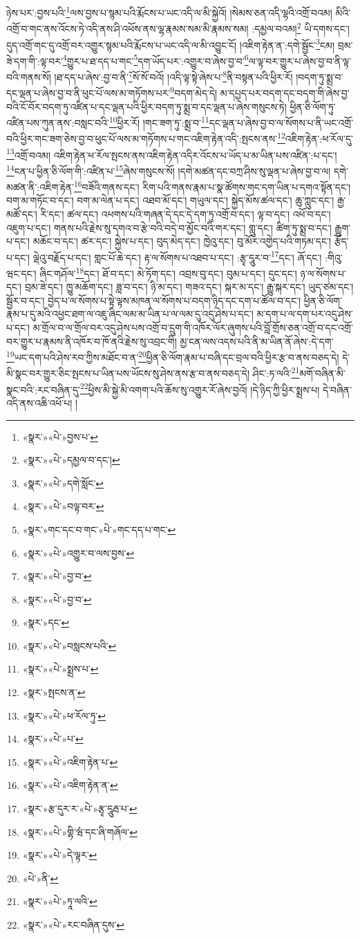 ཉེས་པར་:བྱས་པའི་\footnote{«སྣར་»«པེ་»བྱས་པ་}ལས་བྱས་པ་སྙམ་པའི་རྨོངས་པ་ཡང་འདི་ལ་མི་སྐྱེའོ། །སེམས་ཅན་འདི་ལྷའི་འགྲོ་བའམ། མིའི་འགྲོ་བ་གང་ནས་འོངས་ཏེ་འདི་ནས་ཤི་འཕོས་ནས་ལྷ་རྣམས་སམ་མི་རྣམས་སམ། :དམྱལ་བའམ།\footnote{«སྣར་»«པེ་»དམྱལ་བ་དང་།} ཡི་དགས་དང་། དུད་འགྲོ་གང་དུ་འགྲོ་བར་འགྱུར་སྙམ་པའི་རྨོངས་པ་ཡང་འདི་ལ་མི་འབྱུང་ངོ། །འཇིག་རྟེན་ན་:དགེ་སྦྱོང་\footnote{«སྣར་»«པེ་»དགེ་སློང་}ངམ། བྲམ་ཟེ་དག་གི་:ལྟ་བར་\footnote{«སྣར་»«པེ་»བལྟ་བར་}གྱུར་པ་ཐ་དད་པ་གང་\footnote{«སྣར་»གང་དང་བ་གང་«པེ་»གང་དད་པ་གང་}དག་ཡོད་པར་:འགྱུར་བ་ཞེས་བྱ་བ་\footnote{«སྣར་»«པེ་»འགྱུར་བ་ལས་བྱས་}ལ་ལྟ་བར་གྱུར་པ་ཞེས་བྱ་བ་ནི་ལྟ་བའི་གནས་སོ། །ཐ་དད་པ་ཞེས་:བྱ་བ་ནི་\footnote{«སྣར་»«པེ་»བྱ་བ་}སོ་སོ་བའོ། །འདི་ལྟ་སྟེ་ཞེས་པ་\footnote{«སྣར་»«པེ་»བྱ་བ་}ནི་བསྟན་པའི་ཕྱིར་རོ། །བདག་ཏུ་སྨྲ་བ་དང་ལྡན་པ་ཞེས་བྱ་བ་ནི་ཕུང་པོ་ལས་མ་གཏོགས་པར་\footnote{«སྣར་»དང་}བདག་མེད་དེ། མ་དཔྱད་པར་བདག་དང་བདག་གི་ཞེས་བྱ་བའི་ངོ་བོར་བདག་ཏུ་འཛིན་པ་དང་ལྡན་པའི་ཕྱིར་བདག་ཏུ་སྨྲ་བ་དང་ལྡན་པ་ཞེས་གསུངས་ཏེ། ཕྱིན་ཅི་ལོག་ཏུ་འཛིན་པས་ཀུན་ནས་:བསླང་བའི་\footnote{«སྣར་»«པེ་»བསླངས་པའི་}ཕྱིར་རོ། །གང་ཟག་ཏུ་:སྨྲ་བ་\footnote{«སྣར་»«པེ་»སྨྲས་པ་}དང་ལྡན་པ་ཞེས་བྱ་བ་ལ་སོགས་པ་ནི་ཡང་འགྲོ་བའི་ཕྱིར་གང་ཟག་ཅེས་བྱ་བ་ཕུང་པོ་ལས་མ་གཏོགས་པ་གང་འཇིག་རྟེན་འདི་:སྤངས་ནས་\footnote{«སྣར་»སྤངས་ན་}འཇིག་རྟེན་:ཕ་རོལ་དུ་\footnote{«སྣར་»«པེ་»ཕ་རོལ་ཏུ་}འགྲོ་བའམ། འཇིག་རྟེན་ཕ་རོལ་སྤངས་ནས་འཇིག་རྟེན་འདིར་འོངས་པ་ཡོད་པ་མ་ཡིན་པས་འཛིན་:པ་དང་། \footnote{«སྣར་»«པེ་»པ་}ངན་པ་ཕྱིན་ཅི་ལོག་གི་:འཛིན་པ་\footnote{«སྣར་»«པེ་»འཇིག་རྟེན་པ་}ཞེས་གསུངས་སོ། །དགེ་མཚན་དང་བཀྲ་ཤིས་སུ་ལྡན་པ་ཞེས་བྱ་བ་ལ། དགེ་མཚན་ནི་:འཇིག་རྟེན་\footnote{«སྣར་»«པེ་»འཇིག་རྟེན་ན་}བཟོའི་གནས་དང་། རིག་པའི་གནས་རྣམ་པ་སྣ་ཚོགས་གང་དག་ཡིན་པ་དགའ་སྟོན་དང་། བག་མ་གཏོང་བ་དང་། བག་མ་ལེན་པ་དང་། འཐབ་མོ་དང་། གཡུལ་དང་། སྐྱེད་མོས་ཚལ་དང་། ཆུ་ཀླུང་དང་། རྒྱ་མཚོ་དང་། རི་དང་། ཚལ་དང་། འཕགས་པའི་གཞན་དེ་དང་དེ་དག་ཏུ་འགྲོ་བ་དང་། ལྟ་བ་དང་། འཕོ་བ་དང་། འཇུག་པ་དང་། གནས་པའི་རྗེས་སུ་དགའ་བ་རྩེ་བའི་བདེ་བ་མྱོང་བའི་གར་དང་། གླུ་དང་། ཚིག་ཏུ་སྨྲ་བ་དང་། རྒྱུག་པ་དང་། མཆོང་བ་དང་། ཚར་དང་། སྐྱེས་པ་དང་། བུད་མེད་དང་། ཁྱེའུ་དང་། བུ་མོར་འགྱེད་པའི་གཏམ་དང་། རྩོད་པ་དང་། ལྡེའུ་བརྗོད་པ་དང་། གླང་པོ་ཆེ་དང་། རྟ་ལ་སོགས་པ་འཐབ་པ་དང་། :རྩྭ་དཱུར་བ་\footnote{«སྣར་»རྩ་དུར་ར་«པེ་»རྩྭ་དཱུརྦ་པ་}དང་། ཞོ་དང་། :གིའུ་ཝང་དང་། ཞིང་གཤོལ་\footnote{«སྣར་»«པེ་»གྷི་ཝཾ་དང་ཞི་གཞོལ་}དང་། ཐོ་བ་དང་། མེ་ཏོག་དང་། འབྲས་བུ་དང་། བུམ་པ་དང་། དུང་དང་། ཉ་ལ་སོགས་པ་དང་། བྲམ་ཟེ་དང་། ཁྱུ་མཆོག་དང་། ཟླ་བ་དང་། ཉི་མ་དང་། གཟའ་དང་། སྐར་མ་དང་། རྒྱུ་སྐར་དང་། ཡུད་ཙམ་དང་། སྦྱོར་བ་དང་། བྱེད་པ་ལ་སོགས་པ་སྟེ་ལྟས་མཁན་ལ་སོགས་པ་བདག་ཉིད་དང་དག་པ་ཚོལ་བ་དང་། ཕྱིན་ཅི་ལོག་རྣམ་པ་དུ་མའི་འཕྱང་ཐག་ལ་འཇུ་ཞིང་ལམ་མ་ཡིན་པ་ལ་ལམ་དུ་འདུ་ཤེས་པ་དང་། མ་དག་པ་ལ་དག་པར་འདུ་ཤེས་པ་དང་། མ་གྲོལ་བ་ལ་གྲོལ་བར་འདུ་ཤེས་པས་འགྲོ་བ་དྲུག་གི་འཁོར་ལོར་ཞུགས་པའི་བློ་གྲོས་ཅན་འགྲོ་བ་དང་འགྲོ་བར་གྱུར་པ་རྣམས་ནི་འཁོར་བ་ཁོ་ནའི་རྗེས་སུ་འབྲང་གི། མྱ་ངན་ལས་འདས་པའི་ནི་མ་ཡིན་ནོ་ཞེས་:དེ་དག་\footnote{«སྣར་»«པེ་»དེ་ལྟར་}ཡང་དག་པའི་ཤེས་རབ་ཀྱིས་མཐོང་བ་ན་\footnote{«པེ་»ནི་}ཕྱིན་ཅི་ལོག་རྣམ་པ་བཞི་དང་བྲལ་བའི་ཕྱིར་རྩ་བ་ནས་བཅད་དེ། དེ་མི་སྣང་བར་གྱུར་ཅིང་སྤངས་པ་ཡིན་པས་ཡོངས་སུ་ཤེས་ནས་རྩ་བ་ནས་བཅད་དེ། ཤིང་:ཏ་ལའི་\footnote{«སྣར་»«པེ་»ཏཱ་ལའི་}མགོ་བཞིན་མི་སྣང་བའི་:རང་བཞིན་དུ་\footnote{«སྣར་»«པེ་»རང་བཞིན་དུས་}ཕྱིས་མི་སྐྱེ་མི་འགག་པའི་ཆོས་སུ་འགྱུར་རོ་ཞེས་བྱའོ། །དེ་ཉིད་ཀྱི་ཕྱིར་སྨྲས་པ། དེ་བཞིན་འདི་ནས་འཆི་འཕོ་པ། །
